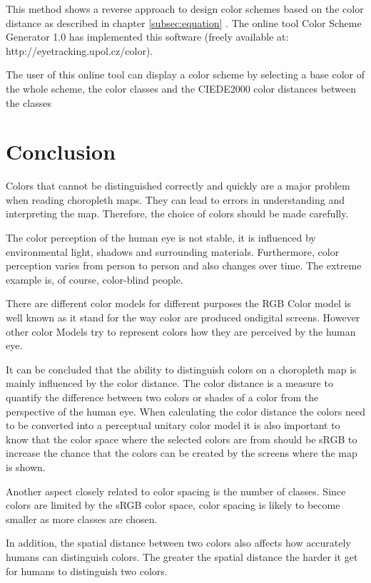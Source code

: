 This method shows a reverse approach to design color schemes based on the color distance as described in chapter \ref{subsec:equation} \parencite{brychtovaC2017}. The online tool Color Scheme Generator 1.0 has implemented this software (freely available at: http://eyetracking.upol.cz/color).

The user of this online tool can display a color scheme by selecting a base color of the whole scheme, the color classes and the CIEDE2000 color distances between the classes \parencite{brychtovaDole2015}

\section{Conclusion}

Colors that cannot be distinguished correctly and quickly are a major problem when reading choropleth maps. They can lead to errors in understanding and interpreting the map. Therefore, the choice of colors should be made carefully.

The color perception of the human eye is not stable, it is influenced by environmental light, shadows and surrounding materials. Furthermore, color perception varies from person to person and also changes over time. The extreme example is, of course, color-blind people. 

There are different color models for different purposes the RGB Color model is well known as it stand for the way color are produced ondigital screens. However other color Models try to represent colors how they are perceived by the human eye. 

It can be concluded that the ability to distinguish colors on a choropleth map is mainly influenced by the color distance. The color distance is a measure to quantify the difference between two colors or shades of a color from the perspective of the human eye. When calculating the color distance the colors need to be converted into a perceptual unitary color model it is also important to know that the color space where the selected colors are from should be sRGB to increase the chance that the colors can be created by the screens where the map is shown. 

Another aspect closely related to color spacing is the number of classes. Since colors are limited by the sRGB color space, color spacing is likely to become smaller as more classes are chosen. 

In addition, the spatial distance between two colors also affects how accurately humans can distinguish colors. The greater the spatial distance the harder it get for humans to distinguish two colors. 


